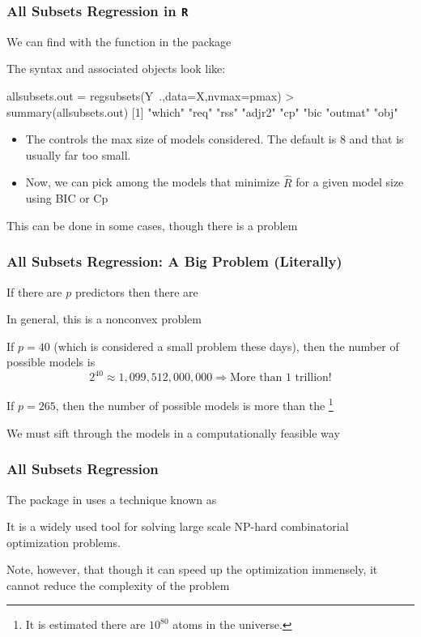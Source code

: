 \documentclass{beamer}
\begin{document}
\begin{frame}[fragile]
\frametitle{All Subsets Regression in {\tt R}} 
We can find with the function  in the package 

\vsp
The syntax and associated objects look like:
\begin{blockcode}
allsubsets.out = regsubsets(Y~.,data=X,nvmax=pmax)
> summary(allsubsets.out)
[1] "which"  "req"  "rss"  "adjr2"  "cp"  "bic  "outmat"  "obj"
\end{blockcode}
\begin{itemize}
\item The  controls the max size of models considered.  The default is 8 and that is usually far too small.
\item Now, we can pick among the   models that minimize $\hat{R}$ for a given model size using BIC or Cp
\end{itemize}
\vsp

This can be done in some cases, though there is a problem
\end{frame}



\begin{frame}[fragile]
\frametitle{All Subsets Regression: A Big Problem  (Literally)}
If there are $p$  predictors  then there are  


\vsp
In general, this is a nonconvex problem 
\vsp

If $p = 40$
(which is considered a small problem these days), then the number of possible models is
\[
2^{40} \approx 1,099,512,000,000 \Rightarrow \textrm{More than 1 trillion!}
\]

\vsp
If $p = 265$, then the number of possible models is more than the \footnote{It is estimated there are $10^{80}$ atoms in the universe.}

\vsp
We must sift through the models in a computationally feasible way
\end{frame}

\begin{frame}[fragile]
\frametitle{All Subsets Regression}
The  package in  uses a technique known as

\vsp

It is a widely used tool for solving large scale NP-hard combinatorial optimization problems.

\vsp
Note, however, that though it can speed up the optimization immensely, it cannot reduce the complexity
of the problem 

\end{frame}
\end{document}

